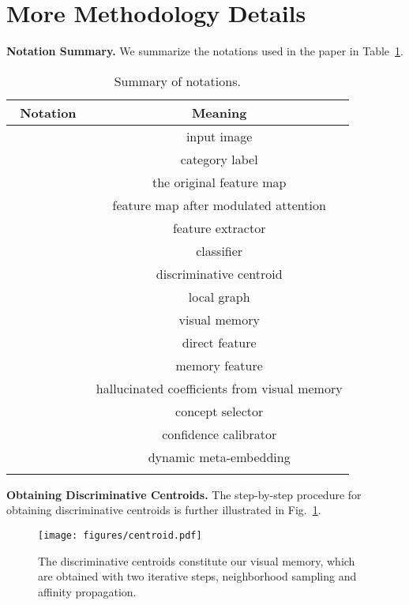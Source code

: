 \documentclass[10pt,twocolumn,letterpaper]{article}
\begin{document}
\section{More Methodology Details}
\label{sec:methodology}

\vspace{2pt}
\noindent
\textbf{Notation Summary.}
We summarize the notations used in the paper in Table~\ref{tab:notation}.

\begin{table}[h]
    \small
    \centering
    \begin{tabular}{l|c}
    \Xhline{1pt}
    ~{\bf Notation}~ & ~{\bf Meaning}~  \\ \hline \hline
     & input image \\ \hline
     & category label \\ \hline
     & the original feature map \\ \hline
     & feature map after modulated attention \\ \hline
     & feature extractor \\ \hline
     & classifier \\ \hline
     & discriminative centroid \\ \hline
     & local graph \\ \hline
     & visual memory \\ \hline
     & direct feature \\ \hline
     & memory feature \\ \hline
     & hallucinated coefficients from visual memory \\ \hline
     & concept selector \\ \hline
     & confidence calibrator \\ \hline
     & dynamic meta-embedding \\ 
    \Xhline{1pt}
    \end{tabular}
    \vspace{-6pt}
    \caption{Summary of notations.}
    \label{tab:notation}
\end{table}

\vspace{2pt}
\noindent
\textbf{Obtaining Discriminative Centroids.}
The step-by-step procedure for obtaining discriminative centroids  is further illustrated in Fig.~\ref{fig:centroid}.

\begin{figure}[h]
  \centering
  \texttt{[image: figures/centroid.pdf]}
  \caption{The discriminative centroids constitute our visual memory, which are obtained with two iterative steps, neighborhood sampling and affinity propagation.}
  \label{fig:centroid}
\end{figure}
\end{document}
